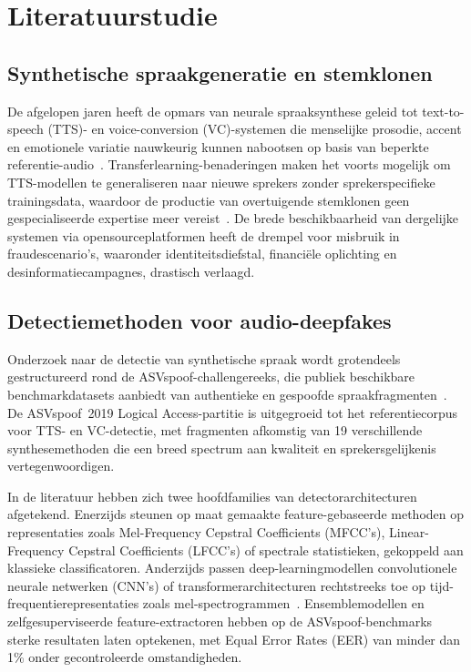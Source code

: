 \documentclass{hogent-article}
\begin{document}
\section{Literatuurstudie}%
\label{sec:literatuurstudie}

\subsection{Synthetische spraakgeneratie en stemklonen}

De afgelopen jaren heeft de opmars van neurale spraaksynthese geleid tot
text-to-speech (TTS)- en voice-conversion (VC)-systemen die menselijke prosodie,
accent en emotionele variatie nauwkeurig kunnen nabootsen op basis van beperkte
referentie-audio~\autocite{Azzuni2025}. Transferlearning-benaderingen maken het
voorts mogelijk om TTS-modellen te generaliseren naar nieuwe sprekers zonder
sprekerspecifieke trainingsdata, waardoor de productie van overtuigende
stemklonen geen gespecialiseerde expertise meer vereist~\autocite{Ruggiero2021}.
De brede beschikbaarheid van dergelijke systemen via opensourceplatformen heeft
de drempel voor misbruik in fraudescenario's, waaronder identiteitsdiefstal,
financiële oplichting en desinformatiecampagnes, drastisch verlaagd.

\subsection{Detectiemethoden voor audio-deepfakes}

Onderzoek naar de detectie van synthetische spraak wordt grotendeels gestructureerd
rond de ASVspoof-challengereeks, die publiek beschikbare benchmarkdatasets
aanbiedt van authentieke en gespoofde spraakfragmenten~\autocite{Wang2020}. De
ASVspoof~2019 Logical Access-partitie is uitgegroeid tot het referentiecorpus voor
TTS- en VC-detectie, met fragmenten afkomstig van 19 verschillende
synthesemethoden die een breed spectrum aan kwaliteit en sprekersgelijkenis
vertegenwoordigen.

In de literatuur hebben zich twee hoofdfamilies van detectorarchitecturen
afgetekend. Enerzijds steunen op maat gemaakte feature-gebaseerde methoden op
representaties zoals Mel-Frequency Cepstral Coefficients (MFCC's),
Linear-Frequency Cepstral Coefficients (LFCC's) of spectrale statistieken,
gekoppeld aan klassieke classificatoren. Anderzijds passen deep-learningmodellen
convolutionele neurale netwerken (CNN's) of transformerarchitecturen rechtstreeks
toe op tijd-frequentierepresentaties zoals mel-spectrogrammen~\autocite{Bartusiak2022}.
Ensemblemodellen en zelfgesuperviseerde feature-extractoren hebben op de
ASVspoof-benchmarks sterke resultaten laten optekenen, met Equal Error Rates
(EER) van minder dan 1\% onder gecontroleerde omstandigheden.
\end{document}
